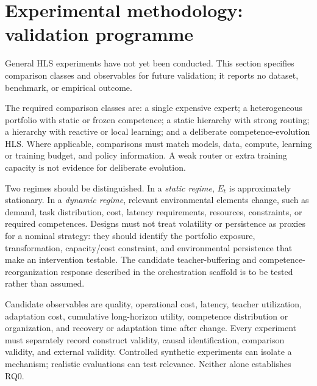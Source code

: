 \section{Experimental methodology: validation programme}

General HLS experiments have not yet been conducted. This section specifies comparison classes and observables for future validation; it reports no dataset, benchmark, or empirical outcome.

The required comparison classes are: a single expensive expert; a heterogeneous portfolio with static or frozen competence; a static hierarchy with strong routing; a hierarchy with reactive or local learning; and a deliberate competence-evolution HLS. Where applicable, comparisons must match models, data, compute, learning or training budget, and policy information. A weak router or extra training capacity is not evidence for deliberate evolution.

Two regimes should be distinguished. In a \emph{static regime}, $E_t$ is approximately stationary. In a \emph{dynamic regime}, relevant environmental elements change, such as demand, task distribution, cost, latency requirements, resources, constraints, or required competences. Designs must not treat volatility or persistence as proxies for a nominal strategy: they should identify the portfolio exposure, transformation, capacity/cost constraint, and environmental persistence that make an intervention testable. The candidate teacher-buffering and competence-reorganization response described in the orchestration scaffold is to be tested rather than assumed.

Candidate observables are quality, operational cost, latency, teacher utilization, adaptation cost, cumulative long-horizon utility, competence distribution or organization, and recovery or adaptation time after change. Every experiment must separately record construct validity, causal identification, comparison validity, and external validity. Controlled synthetic experiments can isolate a mechanism; realistic evaluations can test relevance. Neither alone establishes RQ0.
